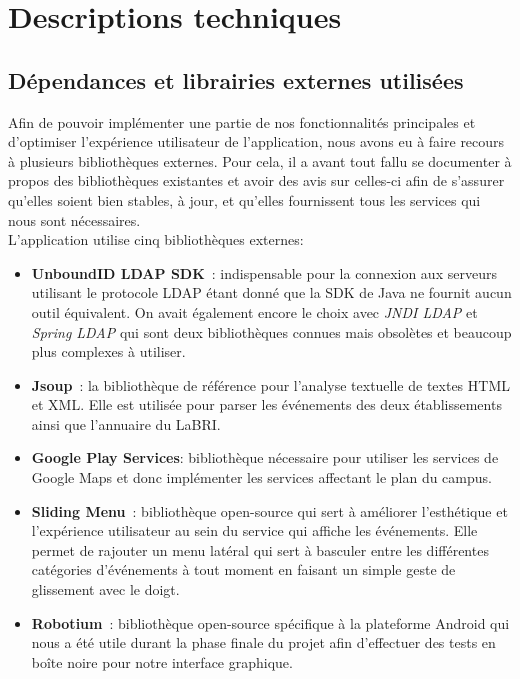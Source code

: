 \chapter{Descriptions techniques}

\section{Dépendances et librairies externes utilisées}

Afin de pouvoir implémenter une partie de nos fonctionnalités principales et d'optimiser l'expérience utilisateur de l'application, nous avons eu à faire recours à plusieurs bibliothèques externes. Pour cela, il a avant tout fallu se documenter à propos des bibliothèques existantes et avoir des avis sur celles-ci afin de s'assurer qu'elles soient bien stables, à jour, et qu'elles fournissent tous les services qui nous sont nécessaires.\\

L'application utilise cinq bibliothèques externes: \\

\begin{itemize}
\renewcommand{\labelitemi}{$\bullet$}
\item \textbf{UnboundID LDAP SDK}~\cite{unboundId}: indispensable pour la connexion aux serveurs utilisant le protocole LDAP étant donné que la SDK de Java ne fournit aucun outil équivalent. On avait également encore le choix avec \textit{JNDI LDAP} et \textit{Spring LDAP} qui sont deux bibliothèques connues mais obsolètes et beaucoup plus complexes à utiliser. \\
\item \textbf{Jsoup}~\cite{jsoup}: la bibliothèque de référence pour l'analyse textuelle de textes HTML et XML. Elle est utilisée pour parser les événements des deux établissements ainsi que l'annuaire du LaBRI. \\
\item \textbf{Google Play Services}: bibliothèque nécessaire pour utiliser les services de Google Maps et donc implémenter les services affectant le plan du campus. \\
\item \textbf{Sliding Menu}~\cite{slidingMenu}: bibliothèque open-source qui sert à améliorer l'esthétique et l'expérience utilisateur au sein du service qui affiche les événements. Elle permet de rajouter un menu latéral qui sert à basculer entre les différentes catégories d'événements à tout moment en faisant un simple geste de glissement avec le doigt. \\
\item \textbf{Robotium}~\cite{robotium}: bibliothèque open-source spécifique à la plateforme Android qui nous a été utile durant la phase finale du projet afin d'effectuer des tests en boîte noire pour notre interface graphique. 
\end{itemize}

